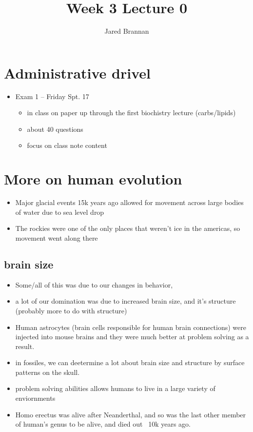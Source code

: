 \documentclass{article}
\title{Week 3 Lecture 0}
\author{Jared Brannan }
\theoremstyle{definition}
\begin{document}
\maketitle

\section{Administrative drivel}
\begin{itemize}
	\item Exam 1 -- Friday Spt. 17 

		\begin{itemize}
			\item in class on paper up through the first biochistry lecture (carbs/lipids)
			\item about 40 questions
			\item focus on class note content
		\end{itemize}
\end{itemize}

\section{More on human evolution}
\begin{itemize}
	\item Major glacial events 15k years ago allowed for movement across large bodies of water due to sea level drop
	\item The rockies were one of the only places that weren't ice in the americas, so movement went along there
\end{itemize}
\subsection{brain size}
\begin{itemize}
	\item Some/all of this was due to our changes in behavior,
	\item a lot of our domination was due to increased brain size, and it's structure (probably more to do with structure)
	\item Human astrocytes (brain cells responsible for human brain connections) were injected into mouse brains and they were much better at problem solving as a result.
	\item in fossiles, we can deetermine a lot about brain size and structure by surface patterns on the skull.
	\item problem solving abilities allows humans to live in a large variety of enviornments
	\item Homo erectus was alive after Neanderthal, and so was the last other member of human's genus to be alive, and died out ~10k years ago.
\end{itemize}
\end{document}
